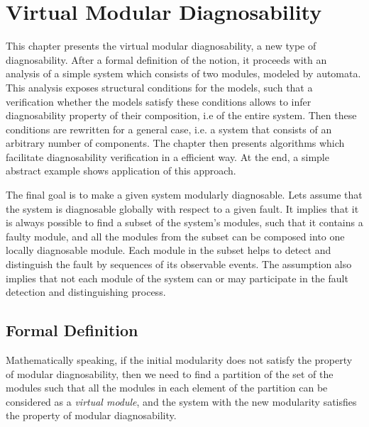 \newtheorem{theorem}{Theorem}
\ifx {} \undefined
	\newtheorem{definition}{Definition}
\fi	
\newtheorem{lemma}{Lemma}
\newtheorem{assumption}{Assumption}

\chapter{Virtual Modular Diagnosability}
\label{chap:theory}

This chapter presents the virtual modular diagnosability, a new type of
diagnosability. After a formal definition of the notion, it proceeds with an
analysis of a simple system which consists of two modules, modeled by automata.
This analysis exposes structural conditions for the models, such that
a verification whether the models satisfy these conditions allows to infer
diagnosability property of their composition, i.e of the entire system. Then
these conditions are rewritten for a general case, i.e. a system that consists
of an arbitrary number of components. The chapter then presents algorithms which
facilitate diagnosability verification in a efficient way. At the end, a
simple abstract example shows application of this approach.  

The final goal is to make a given system modularly diagnosable. Lets assume
that the system is diagnosable globally with respect to a given fault. It
implies that it is always possible to find a subset of the system's modules,
such that it contains a faulty module, and all the modules from the subset can
be composed into one locally diagnosable module. Each module in the subset helps
to detect and distinguish the fault by sequences of its observable events. The
assumption also implies that not each module of the system can or may
participate in the fault detection and distinguishing process. 

\section{Formal Definition}

Mathematically speaking, if the initial modularity does not satisfy the property
of modular diagnosability, then we need to find a partition of the set of the
modules such that all the modules in each element of the partition can be
considered as a \emph{virtual module}, and the system with the new modularity
satisfies the property of modular diagnosability.

